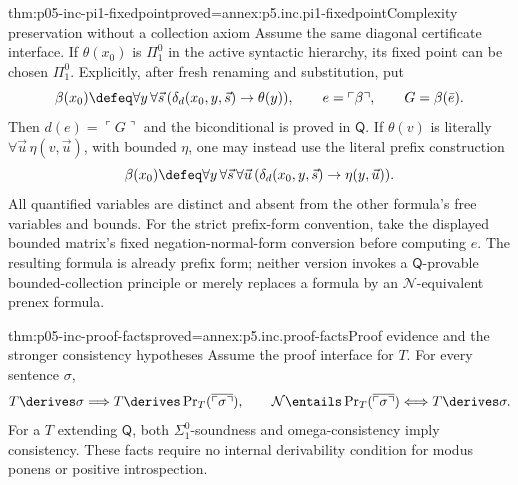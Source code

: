 \begin{hbtheorem}{thm:p05-inc-pi1-fixedpoint}{proved=annex:p5.inc.pi1-fixedpoint}{Complexity preservation without a collection axiom}
Assume the same diagonal certificate interface. If \(\theta(x_0)\)
is \(\Pi^0_1\) in the active syntactic hierarchy, its fixed point can
be chosen \(\Pi^0_1\). Explicitly, after fresh renaming and substitution,
put
\[
 \beta(x_0)\defeq\forall y\,\forall\vec s\,
       (\delta_d(x_0,y,\vec s)\to\theta(y)),\qquad
 e=\ulcorner\beta\urcorner,\qquad G=\beta(\bar e).
\]
Then \(d(e)=\ulcorner G\urcorner\) and the biconditional is proved
in \(\mathsf Q\). If \(\theta(v)\) is literally
\(\forall\vec u\,\eta(v,\vec u)\), with bounded \(\eta\), one
may instead use the literal prefix construction
\[
 \beta(x_0)\defeq\forall y\,\forall\vec s\,\forall\vec u\,
       (\delta_d(x_0,y,\vec s)\to\eta(y,\vec u)).
\]
All quantified variables are distinct and absent from the other formula's
free variables and bounds. For the strict prefix-form convention, take
the displayed bounded matrix's fixed negation-normal-form conversion
before computing \(e\). The resulting formula is already prefix form;
neither version invokes a \(\mathsf Q\)-provable bounded-collection
principle or merely replaces a formula by an \(\mathcal N\)-equivalent
prenex formula.
\end{hbtheorem}

\begin{hblemma}{thm:p05-inc-proof-facts}{proved=annex:p5.inc.proof-facts}{Proof evidence and the stronger consistency hypotheses}
Assume the proof interface for \(T\). For every sentence \(\sigma\),
\[
 T\derives\sigma\Longrightarrow
 T\derives\operatorname{Pr}_T(\overline{\ulcorner\sigma\urcorner}),
 \qquad
 \mathcal N\entails\operatorname{Pr}_T(\overline{\ulcorner\sigma\urcorner})
 \Longleftrightarrow T\derives\sigma.
\]
For a \(T\) extending \(\mathsf Q\), both \(\Sigma^0_1\)-soundness
and omega-consistency imply consistency. These facts require no internal
derivability condition for modus ponens or positive introspection.
\end{hblemma}

